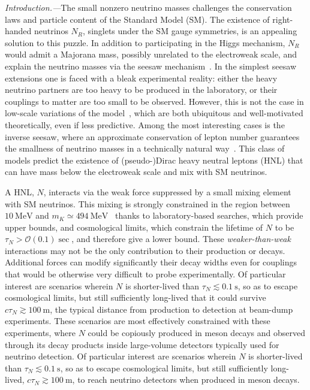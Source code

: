 \documentclass[
reprint,
superscriptaddress,
showpacs,
preprintnumbers,
bibnotes,
amsmath,
amssymb,
aps,
prd,
floatfix
]{revtex4-2}
\begin{document}
\emph{Introduction.---}The small nonzero neutrino masses challenges the conservation laws and particle content of the Standard Model (SM).
The existence of right-handed neutrinos $N_R$, singlets under the SM gauge symmetries, is an appealing solution to this puzzle.
In addition to participating in the Higgs mechanism, $N_R$ would admit a Majorana mass, possibly unrelated to the electroweak scale, and explain the neutrino masses via the seesaw mechanism~\cite{Minkowski:1977sc,*Mohapatra:1979ia,*GellMann:1980vs,*Yanagida:1979as,*Lazarides:1980nt,*Mohapatra:1980yp,*Schechter:1980gr,*Cheng:1980qt,*Foot:1988aq}.
In the simplest seesaw extensions one is faced with a bleak experimental reality: either the heavy neutrino partners are too heavy to be produced in the laboratory, or their couplings to matter are too small to be observed.
However, this is not the case in low-scale variations of the model~\cite{Mohapatra:1986bd,*GonzalezGarcia:1988rw,Wyler:1982dd,*Akhmedov:1995ip,*Akhmedov:1995vm,Barry:2011wb,*Zhang:2011vh}, which are both ubiquitous and well-motivated theoretically, even if less predictive.
Among the most interesting cases is the inverse seesaw, where an approximate conservation of lepton number guarantees the smallness of neutrino masses in a technically natural way~\cite{}.
This class of models predict the existence of (pseudo-)Dirac heavy neutral leptons (HNL) that can have mass below the electroweak scale and mix with SM neutrinos. 

A HNL, $N$, interacts via the weak force suppressed by a small mixing element with SM neutrinos. 
This mixing is strongly constrained in the region between $\SI{10}\MeV$ and $m_K \simeq \SI{494}\MeV$~\cite{Atre:2009rg,deGouvea:2015euy,Drewes:2015iva,Fernandez-Martinez:2016lgt,Chun:2019nwi} thanks to laboratory-based searches, which provide upper bounds, and cosmological limits, which constrain the lifetime of $N$ to be $\tau_N > \mathcal{O}(0.1)\sec$, and therefore give a lower bound. 
These \emph{weaker-than-weak} interactions may not be the only contribution to their production or decays. 
Additional forces can modify significantly their decay widths even for couplings that would be otherwise very difficult to probe experimentally.
Of particular interest are scenarios wherein $N$ is shorter-lived than $\tau_N \lesssim \SI{0.1}\s$, so as to escape cosmological limits, but still sufficiently long-lived that it could survive $c\tau_N \gtrsim \SI{100}\m$, the typical distance from production to detection at beam-dump experiments.
These scenarios are most effectively constrained with these experiments, where $N$ could be copiously produced in meson decays and observed through its decay products inside large-volume detectors typically used for neutrino detection.
Of particular interest are scenarios wherein $N$ is shorter-lived than $\tau_N \lesssim \SI{0.1}\s$, so as to escape cosmological limits, but still sufficiently long-lived, $c\tau_N \gtrsim \SI{100}\m$, to reach neutrino detectors when produced in meson decays.
\end{document}
